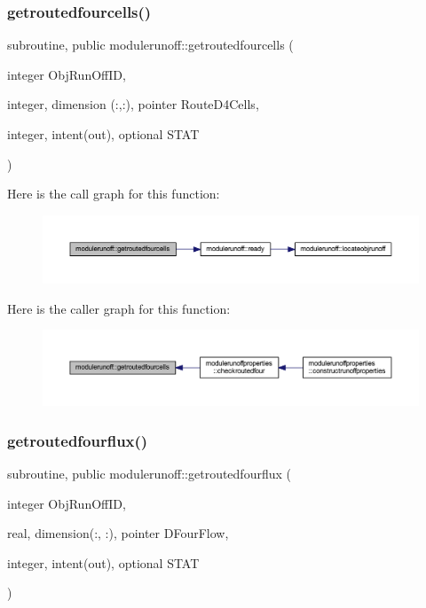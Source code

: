 \subsubsection{\texorpdfstring{getroutedfourcells()}{getroutedfourcells()}}
{\footnotesize\ttfamily subroutine, public modulerunoff\+::getroutedfourcells (\begin{DoxyParamCaption}\item[{integer}]{Obj\+Run\+Off\+ID,  }\item[{integer, dimension (\+:,\+:), pointer}]{Route\+D4\+Cells,  }\item[{integer, intent(out), optional}]{S\+T\+AT }\end{DoxyParamCaption})}

Here is the call graph for this function\+:
\nopagebreak
\begin{figure}[H]
\begin{center}
\leavevmode
\includegraphics[width=350pt]{namespacemodulerunoff_ad1eea51d0c7cb95a4e235e18dad99861_cgraph}
\end{center}
\end{figure}
Here is the caller graph for this function\+:
\nopagebreak
\begin{figure}[H]
\begin{center}
\leavevmode
\includegraphics[width=350pt]{namespacemodulerunoff_ad1eea51d0c7cb95a4e235e18dad99861_icgraph}
\end{center}
\end{figure}
\mbox{\label{namespacemodulerunoff_a8e2e0bbd121e81c889fd2cd186c45b5c}} 
\subsubsection{\texorpdfstring{getroutedfourflux()}{getroutedfourflux()}}
{\footnotesize\ttfamily subroutine, public modulerunoff\+::getroutedfourflux (\begin{DoxyParamCaption}\item[{integer}]{Obj\+Run\+Off\+ID,  }\item[{real, dimension(\+:, \+:), pointer}]{D\+Four\+Flow,  }\item[{integer, intent(out), optional}]{S\+T\+AT }\end{DoxyParamCaption})}

